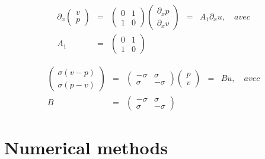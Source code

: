 \documentclass[a4paper,11pt]{article}
\begin{document}
\begin{equation*}
\begin{array}{rclcl}
    \partial_{x}
    \begin{pmatrix}
        v \\
        p
    \end{pmatrix} &=&
    \begin{pmatrix}
        0 & 1 \\
        1 & 0
    \end{pmatrix}
    \begin{pmatrix}
        \partial_{x}p \\
        \partial_{x}v
    \end{pmatrix} &=&
    A_{1}\partial_{x}u, \quad avec \\
    A_{1} &=&
    \begin{pmatrix}
        0 & 1 \\
        1 & 0
    \end{pmatrix} & &
\end{array}
\end{equation*}

\begin{equation*}
\begin{array}{rclcl}
    \begin{pmatrix}
        \sigma(v-p) \\
        \sigma(p-v)
    \end{pmatrix} &=&
    \begin{pmatrix}
        -\sigma & \sigma \\
        \sigma & -\sigma
    \end{pmatrix}
    \begin{pmatrix}
        p \\
        v
    \end{pmatrix} &=&
    Bu, \quad avec \\
    B &=&
    \begin{pmatrix}
        -\sigma & \sigma \\
        \sigma & -\sigma
    \end{pmatrix} & &
\end{array}
\end{equation*}



\section{Numerical methods}

\subsection{}
\end{document}
